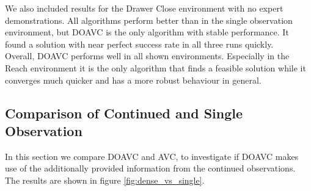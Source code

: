 We also included results for the Drawer Close environment with no expert demonstrations. All algorithms perform better than in the single observation environment, 
but DOAVC is the only algorithm with stable performance. It found a solution with near perfect success rate in all three runs quickly. \\

Overall, DOAVC performs well in all shown environments. Especially in the Reach environment it is the only algorithm that finds a feasible solution while it 
converges much quicker and has a more robust behaviour in general. 






\subsection{Comparison of Continued and Single Observation}
\label{sec:com_coavc_avc}
In this section we compare DOAVC and AVC, to investigate if DOAVC makes use of the additionally provided information from the continued observations. 
The results are shown in figure \ref{fig:dense_vs_single}.\\

